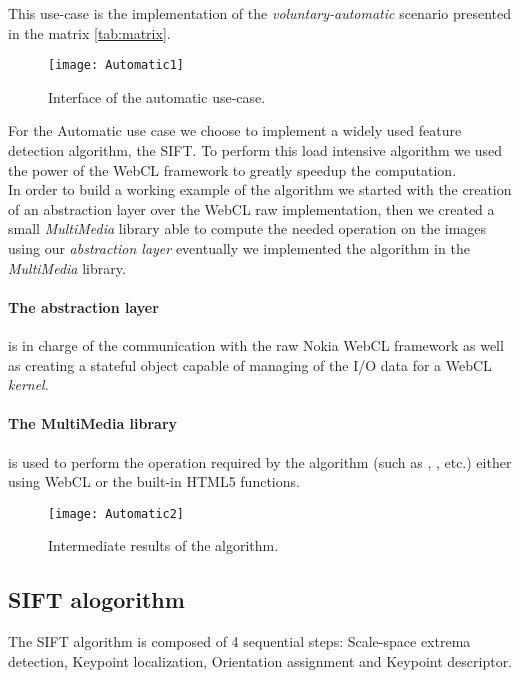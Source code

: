 This use-case is the implementation of the \emph{voluntary-automatic} scenario
presented in the matrix \autoref{tab:matrix}.

\begin{figure}[htb]
    \centering
    \texttt{[image: Automatic1]}
    \caption{Interface of the automatic use-case.}
    \label{fig:Automatic1}
\end{figure}

For the Automatic use case we choose to implement a widely used feature detection
algorithm, the \ac{SIFT}. To perform this load intensive algorithm we used the
power of the \ac{WebCL} framework to greatly speedup the computation.\\

In order to build a working example of the algorithm we started with the creation
of an abstraction layer over the \ac{WebCL} raw implementation, then we created
a small \emph{MultiMedia} library able to compute the needed operation on the
images using our \emph{abstraction layer} eventually we implemented the algorithm
in the \emph{MultiMedia} library.

\paragraph{The abstraction layer} is in charge of the communication with the raw
Nokia WebCL framework as well as creating a stateful object capable of
managing of the I/O data for a WebCL \emph{kernel}.

\paragraph{The MultiMedia library} is used to perform the operation required by
the algorithm (such as , ,  etc.) either
using \ac{WebCL} or the built-in HTML5 functions.
\begin{figure}[htb]
    \centering
    \texttt{[image: Automatic2]}
    \caption{Intermediate results of the algorithm.}
    \label{fig:Automatic2}
\end{figure}

\subsection{SIFT alogorithm}
The \ac{SIFT} algorithm is composed of 4 sequential steps: Scale-space extrema
detection, Keypoint localization, Orientation assignment and Keypoint descriptor.

